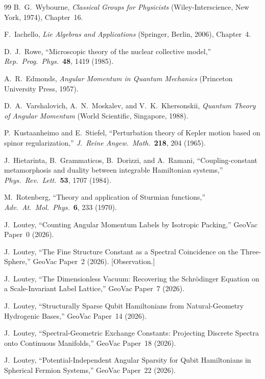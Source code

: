 \documentclass[twocolumn,pra,amsmath,amssymb,superscriptaddress]{revtex4-2}
\begin{document}
\begin{thebibliography}{99}
B.~G.\ Wybourne,
\textit{Classical Groups for Physicists}
(Wiley-Interscience, New York, 1974), Chapter~16.

F.~Iachello,
\textit{Lie Algebras and Applications}
(Springer, Berlin, 2006), Chapter~4.

D.~J.\ Rowe,
``Microscopic theory of the nuclear collective model,''
\textit{Rep.\ Prog.\ Phys.}\ \textbf{48}, 1419 (1985).

A.~R.\ Edmonds,
\textit{Angular Momentum in Quantum Mechanics}
(Princeton University Press, 1957).

D.~A.\ Varshalovich, A.~N.\ Moskalev, and V.~K.\ Khersonskii,
\textit{Quantum Theory of Angular Momentum}
(World Scientific, Singapore, 1988).

P.~Kustaanheimo and E.~Stiefel,
``Perturbation theory of Kepler motion based on spinor regularization,''
\textit{J.\ Reine Angew.\ Math.}\ \textbf{218}, 204 (1965).

J.~Hietarinta, B.~Grammaticos, B.~Dorizzi, and A.~Ramani,
``Coupling-constant metamorphosis and duality between integrable
Hamiltonian systems,''
\textit{Phys.\ Rev.\ Lett.}\ \textbf{53}, 1707 (1984).

M.~Rotenberg,
``Theory and application of Sturmian functions,''
\textit{Adv.\ At.\ Mol.\ Phys.}\ \textbf{6}, 233 (1970).

J.~Loutey,
``Counting Angular Momentum Labels by Isotropic Packing,''
GeoVac Paper~0 (2026).

J.~Loutey,
``The Fine Structure Constant as a Spectral Coincidence on the
Three-Sphere,''
GeoVac Paper~2 (2026). [Observation.]

J.~Loutey,
``The Dimensionless Vacuum: Recovering the Schr\"odinger Equation
on a Scale-Invariant Label Lattice,''
GeoVac Paper~7 (2026).

J.~Loutey,
``Structurally Sparse Qubit Hamiltonians from Natural-Geometry Hydrogenic Bases,''
GeoVac Paper~14 (2026).

J.~Loutey,
``Spectral-Geometric Exchange Constants: Projecting Discrete Spectra
onto Continuous Manifolds,''
GeoVac Paper~18 (2026).

J.~Loutey,
``Potential-Independent Angular Sparsity for Qubit Hamiltonians in
Spherical Fermion Systems,''
GeoVac Paper~22 (2026).


\end{thebibliography}
\end{document}
